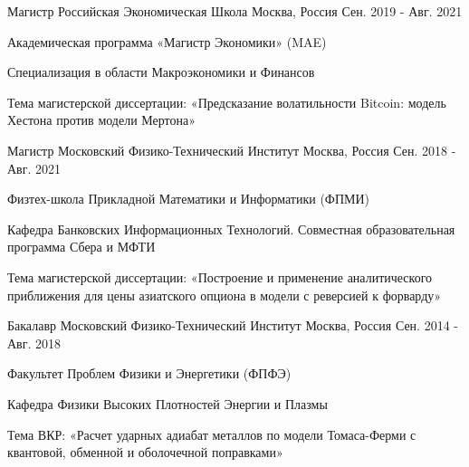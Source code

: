 

\begin{cventries}

  \cventry
  {Магистр} %
  {Российская Экономическая Школа} %
  {Москва, Россия} %
  {Сен. 2019 - Авг. 2021} %
  {
    \begin{cvitems} %
      \item {Академическая программа «Магистр Экономики» (MAE)}
      \item {Специализация в области Макроэкономики и Финансов}
      \item {Тема магистерской диссертации: «Предсказание волатильности Bitcoin: модель Хестона против модели Мертона»}
    \end{cvitems}
  }

  \cventry
  {Магистр} %
  {Московский Физико-Технический Институт} %
  {Москва, Россия} %
  {Сен. 2018 - Авг. 2021} %
  {
    \begin{cvitems} %
      \item {Физтех-школа Прикладной Математики и Информатики (ФПМИ)}
      \item {Кафедра Банковских Информационных Технологий. Совместная образовательная программа Сбера и МФТИ}
      \item {Тема магистерской диссертации: «Построение и применение аналитического приближения для цены азиатского опциона в модели с реверсией к форварду»}
    \end{cvitems}
  }

  \cventry
  {Бакалавр} %
  {Московский Физико-Технический Институт} %
  {Москва, Россия} %
  {Сен. 2014 - Авг. 2018} %
  {
    \begin{cvitems} %
      \item {Факультет Проблем Физики и Энергетики (ФПФЭ)}
      \item {Кафедра Физики Высоких Плотностей Энергии и Плазмы}
      \item {Тема ВКР: «Расчет ударных адиабат металлов по модели Томаса-Ферми с квантовой, обменной и оболочечной поправками»}
    \end{cvitems}
  }


\end{cventries}
